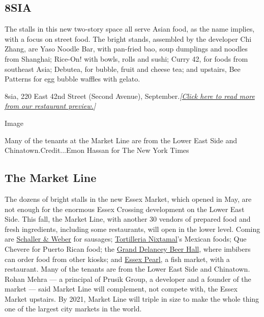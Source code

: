 \hypertarget{8sia}{%
\subsection{8SIA}\label{8sia}}

The stalls in this new two-story space all serve Asian food, as the name
implies, with a focus on street food. The bright stands, assembled by
the developer Chi Zhang, are Yaso Noodle Bar, with pan-fried bao, soup
dumplings and noodles from Shanghai; Rice-On! with bowls, rolls and
sushi; Curry 42, for foods from southeast Asia; Debutea, for bubble,
fruit and cheese tea; and upstairs, Bee Patterns for egg bubble waffles
with gelato.

8sia, 220 East 42nd Street (Second Avenue),
September.\emph{{[}}\href{https://www.nytimes3xbfgragh.onion/2019/09/03/dining/fall-restaurant-preview-nyc.html}{\emph{Click
here to read more from our restaurant preview.}}\emph{{]}}

Image

Many of the tenants at the Market Line are from the Lower East Side and
Chinatown.Credit...Emon Hassan for The New York Times

\hypertarget{the-market-line}{%
\subsection{The Market Line}\label{the-market-line}}

The dozens of bright stalls in the new Essex Market, which opened in
May, are not enough for the enormous Essex Crossing development on the
Lower East Side. This fall, the Market Line, with another 30 vendors of
prepared food and fresh ingredients, including some restaurants, will
open in the lower level. Coming are
\href{https://schallerweber.com/}{Schaller \& Weber} for sausages;
\href{https://www.tortillerianixtamal.com/}{Tortilleria Nixtamal}'s
Mexican foods; Que Chevere for Puerto Rican food; the
\href{https://marketline.nyc/vendors/grand-delancey/}{Grand Delancey
Beer Hall}, where imbibers can order food from other kiosks; and
\href{https://www.essexpearl.com/}{Essex Pearl}, a fish market, with a
restaurant. Many of the tenants are from the Lower East Side and
Chinatown. Rohan Mehra --- a principal of Prusik Group, a developer and
a founder of the market --- said Market Line will complement, not
compete with, the Essex Market upstairs. By 2021, Market Line will
triple in size to make the whole thing one of the largest city markets
in the world.

